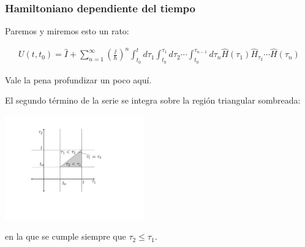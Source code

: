 \documentclass{beamer}
\begin{document}
\begin{frame}
    \frametitle{Hamiltoniano dependiente del tiempo}

    Paremos y miremos esto un rato:
    
        \begin{align*} 
            U(t,t_0)=
            \hat{I}+
            \sum_{n=1}^\infty
            \left(\frac{\ii}{\hbar}\right)^n
            \int_{t_0}^{t}d\tau_{1}
            \int_{t_0}^{\tau_1}d\tau_2
            \cdots
            \int_{t_0}^{\tau_{n-1}}d\tau_n
            \hat{H}(\tau_1)\hat{H}_{\tau_2}\cdots\hat{H}(\tau_n) 
        \end{align*}
    
        Vale la pena profundizar un poco aquí.
\end{frame}

\begin{frame}
    El segundo término de la serie se integra sobre la región triangular sombreada:
    \begin{center}
        \includegraphics[width=6cm]{figs/nidos.pdf} 
    \end{center}
    en la que se cumple siempre que $\tau_2 \leq \tau_1$.

    
\end{frame}
\end{document}
